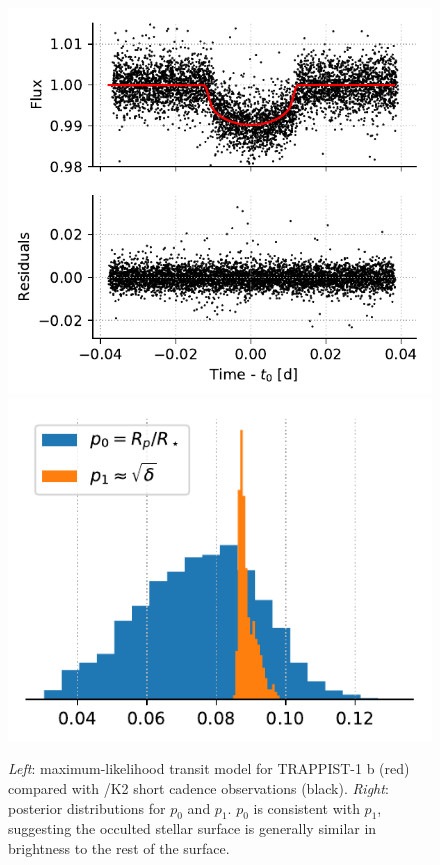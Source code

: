 \begin{figure}%
    \centering
    \includegraphics[scale=0.75]{robin/trappist1b_residuals.pdf}
    \includegraphics[scale=0.75]{robin/trappist1b_agreement.pdf}
    \caption{\textsl{Left}: maximum-likelihood transit model for TRAPPIST-1 b (red) compared with \kepler/K2 short cadence observations (black). \textsl{Right}: posterior distributions for $p_0$ and $p_1$. $p_0$ is consistent with $p_1$, suggesting the occulted stellar surface is generally similar in brightness to the rest of the surface. }
    \label{fig:t1b}
\end{figure}

